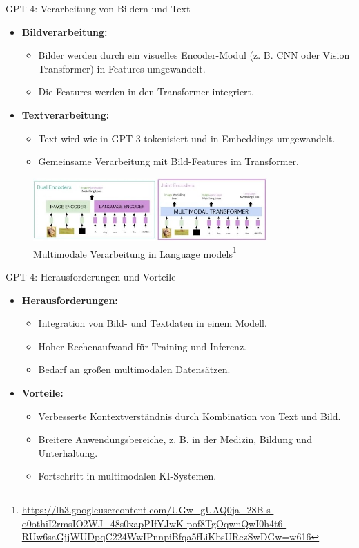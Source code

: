 \documentclass[aspectratio=1610, xcolor=dvipsnames, 9pt]{beamer}
\begin{document}
\begin{frame}{GPT-4: Verarbeitung von Bildern und Text}
  \begin{itemize}
    \item \textbf{Bildverarbeitung:}
      \begin{itemize}
        \item Bilder werden durch ein visuelles Encoder-Modul (z. B. CNN oder Vision Transformer) in Features umgewandelt.
        \item Die Features werden in den Transformer integriert.
      \end{itemize}
    \item \textbf{Textverarbeitung:}
      \begin{itemize}
        \item Text wird wie in GPT-3 tokenisiert und in Embeddings umgewandelt.
        \item Gemeinsame Verarbeitung mit Bild-Features im Transformer.
      \end{itemize}
  \end{itemize}
  \begin{figure}
    \centering
      \includegraphics[width=0.8\textwidth]{images/multimodal.jpg}
      \caption{Multimodale Verarbeitung in Language models\footnote{\url{https://lh3.googleusercontent.com/UGw_gUAQ0ja_28B-s-o0othiI2rmsIO2WJ_48s0xapPIfYJwK-pof8TgOqwnQwI0h4t6-RUw6saGjjWUDpqC224WwIPnnpiBfqa5fLiKbsURczSwDGw=w616}}}
  \end{figure}
\end{frame}

\begin{frame}{GPT-4: Herausforderungen und Vorteile}
  \begin{itemize}
    \item \textbf{Herausforderungen:}
      \begin{itemize}
        \item Integration von Bild- und Textdaten in einem Modell.
        \item Hoher Rechenaufwand für Training und Inferenz.
        \item Bedarf an großen multimodalen Datensätzen.
      \end{itemize}
    \item \textbf{Vorteile:}
      \begin{itemize}
        \item Verbesserte Kontextverständnis durch Kombination von Text und Bild.
        \item Breitere Anwendungsbereiche, z. B. in der Medizin, Bildung und Unterhaltung.
        \item Fortschritt in multimodalen KI-Systemen.
      \end{itemize}
  \end{itemize}
\end{frame}
\end{document}
